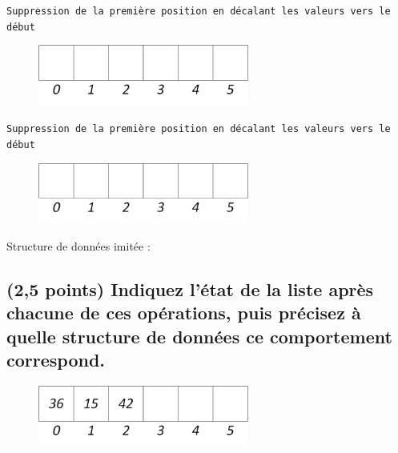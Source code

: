 \documentclass[11pt,a4paper]{article}
\begin{document}
\begin{center}
\texttt{Suppression de la première position en décalant les valeurs vers le début}

\begin{figure}[ht!]
\centering
\centerline{  %
\includegraphics[height=2cm]{img/Liste_t_vide.png}
}
\end{figure}


\texttt{Suppression de la première position en décalant les valeurs vers le début}

\begin{figure}[ht!]
\centering
\centerline{  %
\includegraphics[height=2cm]{img/Liste_t_vide.png}
}
\end{figure}


\end{center}

Structure de données imitée :



\newpage

\subsection{(2,5 points) Indiquez l'état de la liste après chacune de ces opérations, puis précisez à quelle structure de données ce comportement correspond. }


\begin{figure}[ht!]
\centering
\centerline{  %
\includegraphics[height=2cm]{img/Liste_t_1.png}
}
\end{figure}
\end{document}
